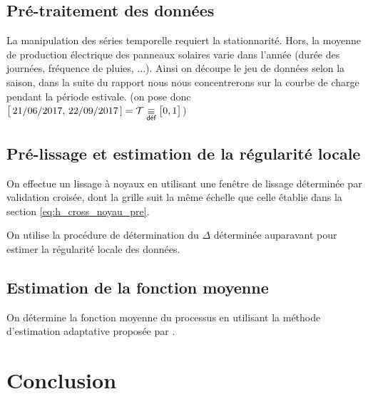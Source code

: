 \subsection{Pré-traitement des données}

La manipulation des séries temporelle requiert la stationnarité. Hors, la moyenne de production électrique des panneaux solaires varie dans l'année (durée des journées, fréquence de pluies, ...). Ainsi on découpe le jeu de données selon la saison, dans la suite du rapport nous nous concentrerons sur la courbe de charge pendant la période estivale. (on pose donc $\bigl[ \, 21/06/2017, \, 22/09/2017 \, ] = \mathcal T \isdef \bigl[ 0, 1 \bigr]$)

\subsection{Pré-lissage et estimation de la régularité locale}

On effectue un lissage à noyaux en utilisant une fenêtre de lissage déterminée par validation croisée, dont la grille suit la même échelle que celle établie dans la section \ref{eq:h_cross_noyau_pre}.


On utilise la procédure de détermination du $\Delta$ déterminée auparavant pour estimer la régularité locale des données.

\subsection{Estimation de la fonction moyenne}

On détermine la fonction moyenne du processus en utilisant la méthode d'estimation adaptative proposée par \cite{maissoro-SmoothnessFTSweakDep}.


\section{Conclusion}
